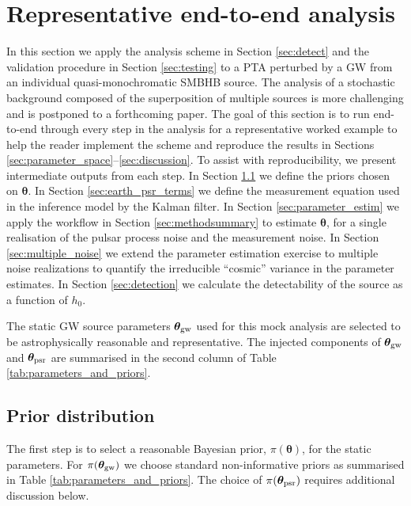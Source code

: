 \documentclass[fleqn,usenatbib,useAMS]{mnras}
\begin{document}
\section{Representative end-to-end analysis} \label{sec:rep_example}
In this section we apply the analysis scheme in Section \ref{sec:detect} and the validation procedure in Section \ref{sec:testing} to a PTA perturbed by a GW from an individual quasi-monochromatic SMBHB source. The analysis of a stochastic background composed of the superposition of multiple sources is more challenging and is postponed to a forthcoming paper. The goal of this section is to run end-to-end through every step in the analysis for a representative worked example to help the reader implement the scheme and reproduce the results in Sections \ref{sec:parameter_space}--\ref{sec:discussion}. To assist with reproducibility, we present intermediate outputs from each step. In Section \ref{sec:priors} we define the priors chosen on $\boldsymbol{\theta}$. In Section \ref{sec:earth_psr_terms} we define the measurement equation used in the inference model by the Kalman filter. In Section \ref{sec:parameter_estim} we apply the workflow in Section \ref{sec:methodsummary} to estimate $\boldsymbol{\theta}$, for a single realisation of the pulsar process noise and the measurement noise. In Section \ref{sec:multiple_noise} we extend the parameter estimation exercise to multiple noise realizations to quantify the irreducible ``cosmic'' variance in the parameter estimates. In Section \ref{sec:detection} we calculate the detectability of the source as a function of $h_0$. \newline


The static GW source parameters $\boldsymbol{\theta}_{\rm gw}$ used for this mock analysis are selected to be astrophysically reasonable and representative. The injected components of $\boldsymbol{\theta}_{\rm gw}$ and $\boldsymbol{\theta}_{\rm psr}$ are summarised in the second column of Table \ref{tab:parameters_and_priors}.

\subsection{Prior distribution}\label{sec:priors}
The first step is to select a reasonable Bayesian prior, $\pi(\boldsymbol{\theta})$, for the static parameters. For $\pi(\boldsymbol{\theta}_{\rm gw})$ we choose standard non-informative priors \citep[e.g.][]{Bhagwat2021} as summarised in Table \ref{tab:parameters_and_priors}. The choice of $\pi(\boldsymbol{\theta}_{\rm psr})$ requires additional discussion below. \newline 
\end{document}
